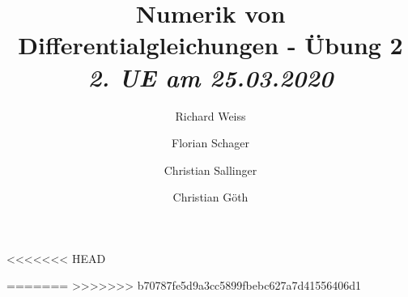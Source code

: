 \documentclass{article}
\title
{
  Numerik von Differentialgleichungen - Übung 2 \\
  \vspace{4pt}
  \normalsize
  \textit{2. UE am 25.03.2020}
}
\author
{
  Richard Weiss       \and
  Florian Schager     \and
  Christian Sallinger \and
  Christian Göth
}
\date{}
\begin{document}
\maketitle



<<<<<<< HEAD

=======
% 
>>>>>>> b70787fe5d9a3cc5899fbebc627a7d41556406d1


\end{document}
